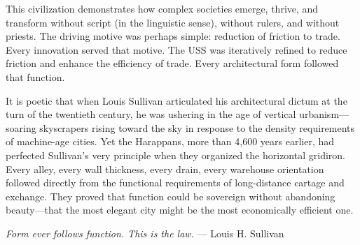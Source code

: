 \documentclass[12pt]{article}
\begin{document}
This civilization demonstrates how complex societies emerge, thrive, and transform
without script (in the linguistic sense), without rulers, and without priests. The
driving motive was perhaps simple: reduction of friction to trade. Every innovation
served that motive. The USS was iteratively refined to reduce friction and enhance
the efficiency of trade. Every architectural form followed that function.

It is poetic that when Louis Sullivan articulated his architectural dictum at
the turn of the twentieth century, he was ushering in the age of vertical
urbanism---soaring skyscrapers rising toward the sky in response to the
density requirements of machine-age cities. Yet the Harappans, more than
4,600 years earlier, had perfected Sullivan's very principle when they
organized the horizontal gridiron. Every alley, every wall thickness,
every drain, every warehouse orientation followed directly from the
functional requirements of long-distance cartage and exchange. They
proved that function could be sovereign without abandoning beauty---that
the most elegant city might be the most economically efficient one.

\vspace{0.3in}

\textit{Form ever follows function. This is the law.} --- Louis H. Sullivan
\end{document}
